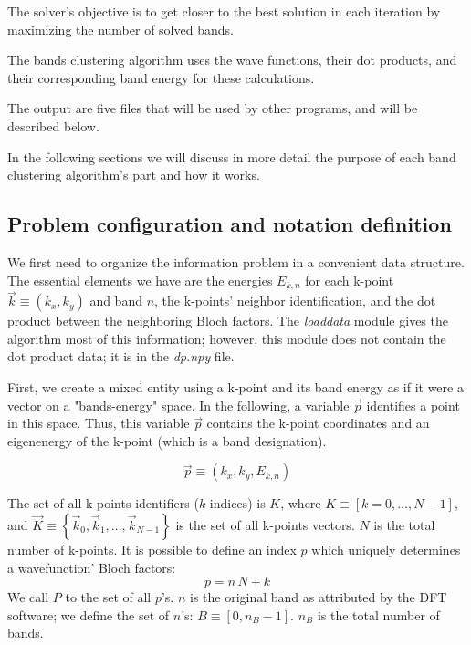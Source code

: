 \documentclass[a4paper,12pt]{report}
\begin{document}
\begin{appendices}
The solver's objective is to get closer to the best solution in each iteration by maximizing the number of solved bands.

The bands clustering algorithm uses the wave functions, their dot products, and their corresponding band energy for these calculations.

The output are five files that will be used by other programs, and will be described below.

In the following sections we will discuss in more detail the purpose of each band clustering algorithm's part and how it works.



\subsection{Problem configuration and notation definition}

We first need to organize the information problem in a convenient data structure.
The essential elements we have are the energies $E_{k,n}$ for each k-point $\vec{k}\equiv \left(k_x, k_y\right)$ and band $n$, the k-points' neighbor identification, and the dot product between the neighboring Bloch factors.
The \textit{loaddata} module gives the algorithm most of this information; however, this module does not contain the dot product data; it is in the \textit{dp.npy} file.

First, we create a mixed entity using a k-point and its band energy as if it were a vector on a "bands-energy" space.
In the following, a variable $\vec{p}$ identifies a point in this space.
Thus, this variable $\vec{p}$ contains the k-point coordinates and an eigenenergy of the k-point (which is a band designation).

\begin{equation}
    \vec{p} \equiv \left(k_x, k_y, E_{k,n}\right)
\end{equation}

The set of all k-points identifiers ($k$ indices) is $K$, where $K \equiv \left[k = 0,\dots,  N-1\right]$, and $\vec{K}\equiv \left\{\vec{k}_0, \vec{k}_1, \dots, \vec{k}_{N-1}\right\}$ is the set of all k-points vectors.
$N$ is the total number of k-points.
It is possible to define an index $p$ which uniquely determines a wavefunction' Bloch factors:
\begin{equation}
    p = n\, N + k
\end{equation}
We call $P$ to the set of all $p$'s.
$n$ is the original band as attributed by the DFT software; we define the set of $n$'s: $B\equiv\left[0, n_B-1\right]$.
$n_B$ is the total number of bands.



\end{appendices}
\end{document}
